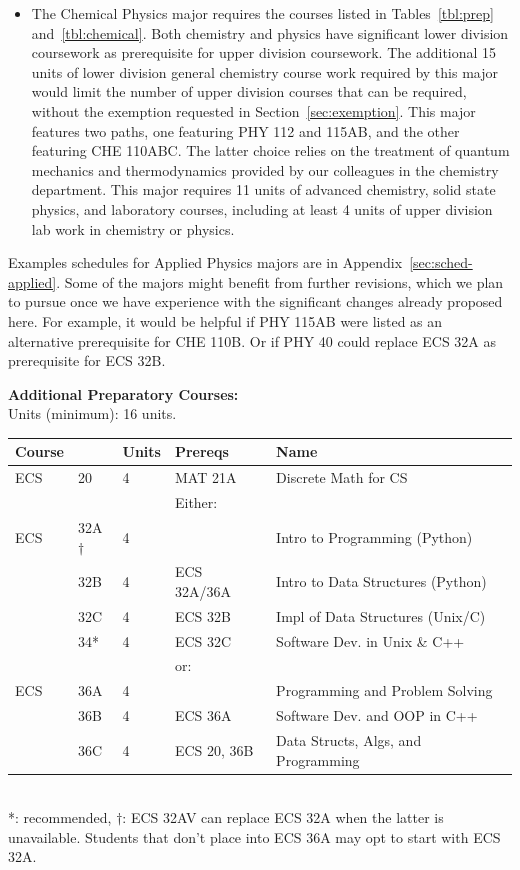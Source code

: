 \documentclass[12pt]{article}
\begin{document}
\begin{itemize}
\item The Chemical Physics major requires the courses listed in
  Tables~\ref{tbl:prep} and~\ref{tbl:chemical}.  Both chemistry
  and physics have significant lower division coursework as
  prerequisite for upper division coursework.  The additional 15 units
  of lower division general chemistry course work required by this
  major would limit the number of upper division courses that can be
  required, without the exemption requested in
  Section~\ref{sec:exemption}.  This major features two paths, one featuring PHY 112 and
  115AB, and the other featuring CHE 110ABC.  The latter choice relies
  on the treatment of quantum mechanics and thermodynamics provided by
  our colleagues in the chemistry department.  This major requires 11
  units of advanced chemistry, solid state physics, and laboratory
  courses, including at least 4 units of upper division lab work in
  chemistry or physics.
\end{itemize}
Examples schedules for Applied Physics majors are in
Appendix~\ref{sec:sched-applied}.  Some of the majors might benefit
from further revisions, which we plan to pursue once we have
experience with the significant changes already proposed here.  For
example, it would be helpful if PHY 115AB were listed as an
alternative prerequisite for CHE 110B.  Or if PHY 40 could replace ECS
32A as prerequisite for ECS 32B.


\newpage
{}
\vskip 0.25cm
\noindent
{\bf Additional Preparatory Courses:  }\\
Units (minimum):  16 units.\\
\begin{tabular}{|lllll|}
\hline
Course & & Units & Prereqs & Name \\
\hline
ECS & 20            & 4 & MAT 21A  & Discrete Math for CS\\
\hline
\hline
 & & & Either: & \\
ECS & 32A$\dagger$ & 4 &          & Intro to Programming (Python)\\
    & 32B  & 4 & ECS 32A/36A  & Intro to Data Structures (Python)\\
    & 32C  & 4 & ECS 32B      & Impl of Data Structures (Unix/C)\\
    & 34*  & 4 & ECS 32C      & Software Dev. in Unix \& C++ \\
\hline
    & & & or: & \\
ECS & 36A  & 4 &                     & Programming and Problem Solving\\
    & 36B  & 4 & ECS 36A         & Software Dev. and OOP in C++\\
    & 36C  & 4 & ECS 20, 36B & Data Structs, Algs, and Programming\\
\hline
\end{tabular}\\
*: recommended, $\dagger$: ECS 32AV can replace ECS 32A when the
latter is unavailable.  Students that don't place into ECS 36A may opt
to start with ECS 32A.
\end{document}
